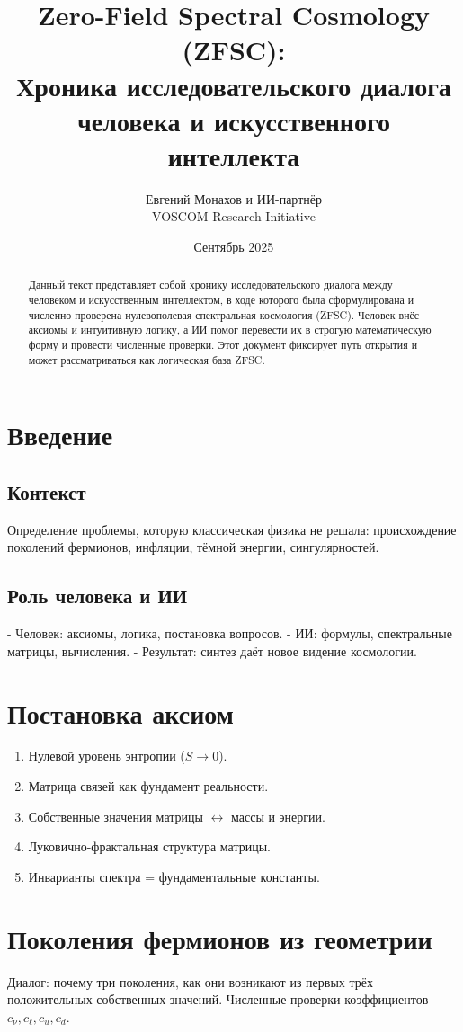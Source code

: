 \documentclass[12pt,a4paper]{article}
\title{Zero-Field Spectral Cosmology (ZFSC): \\
Хроника исследовательского диалога человека и искусственного интеллекта}
\author{Евгений Монахов и ИИ-партнёр \\ VOSCOM Research Initiative}
\date{Сентябрь 2025}
\begin{document}
\maketitle

\begin{abstract}
Данный текст представляет собой хронику исследовательского диалога между человеком и искусственным интеллектом, в ходе которого была сформулирована и численно проверена нулевополевая спектральная космология (ZFSC).
Человек внёс аксиомы и интуитивную логику, а ИИ помог перевести их в строгую математическую форму и провести численные проверки.
Этот документ фиксирует путь открытия и может рассматриваться как логическая база ZFSC.
\end{abstract}

\section{Введение}
\subsection{Контекст}
Определение проблемы, которую классическая физика не решала: происхождение поколений фермионов, инфляции, тёмной энергии, сингулярностей.

\subsection{Роль человека и ИИ}
- Человек: аксиомы, логика, постановка вопросов.
- ИИ: формулы, спектральные матрицы, вычисления.
- Результат: синтез даёт новое видение космологии.

\section{Постановка аксиом}
\begin{enumerate}
  \item Нулевой уровень энтропии ($S\to 0$).
  \item Матрица связей как фундамент реальности.
  \item Собственные значения матрицы $\leftrightarrow$ массы и энергии.
  \item Луковично-фрактальная структура матрицы.
  \item Инварианты спектра = фундаментальные константы.
\end{enumerate}

\section{Поколения фермионов из геометрии}
Диалог: почему три поколения, как они возникают из первых трёх положительных собственных значений.
Численные проверки коэффициентов $c_\nu, c_\ell, c_u, c_d$.
\end{document}
